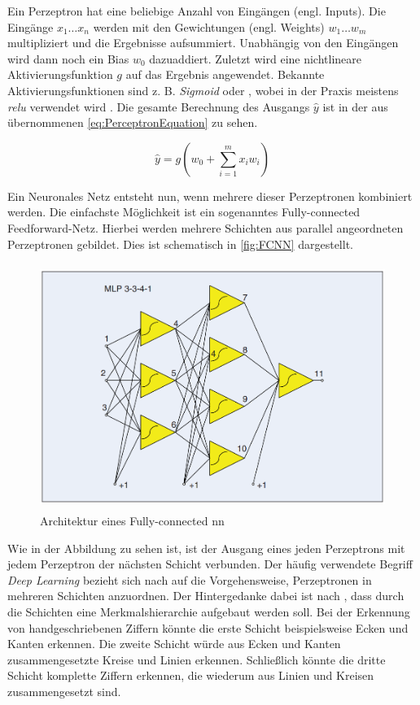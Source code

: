 Ein Perzeptron hat eine beliebige Anzahl von Eingängen (engl. Inputs).
Die Eingänge $x_1 \dots x_n$ werden mit den Gewichtungen (engl. Weights) $w_1 \dots w_m$ multipliziert und die Ergebnisse aufsummiert.
Unabhängig von den Eingängen wird dann noch ein Bias $w_0$ dazuaddiert.
Zuletzt wird eine nichtlineare Aktivierungsfunktion $g$ auf das Ergebnis angewendet.
Bekannte Aktivierungsfunktionen sind z. B. \emph{Sigmoid} oder \emph{}, wobei in der Praxis meistens \emph{\acrshort{relu}} verwendet wird \cite{ActivFuncSharma,ActivFuncNwankpa}.
Die gesamte Berechnung des Ausgangs $\hat{y}$ ist in der aus \cite{6S191Intro} übernommenen \autoref{eq:PerceptronEquation} zu sehen.

\begin{equation}
    \hat{y} = g\left(w_0 + \sum_{i=1}^{m} x_i w_i \right)  
\label{eq:PerceptronEquation}
\end{equation}

Ein Neuronales Netz entsteht nun, wenn mehrere dieser Perzeptronen kombiniert werden.
Die einfachste Möglichkeit ist ein sogenanntes Fully-connected Feedforward-Netz.
Hierbei werden mehrere Schichten aus parallel angeordneten Perzeptronen gebildet.
Dies ist schematisch in \autoref{fig:FCNN} dargestellt.

\begin{figure}[h]
    \centering
    \includegraphics[width=1\textwidth,height=8cm,keepaspectratio=true]{content/images/FCNN.png}
    \caption{Architektur eines Fully-connected \acrshort{nn} \cite[FIGURE 1]{NNArchitectures}}
    \label{fig:FCNN}
\end{figure}

Wie in der Abbildung zu sehen ist, ist der Ausgang eines jeden Perzeptrons mit jedem Perzeptron der nächsten Schicht verbunden.
Der häufig verwendete Begriff \emph{Deep Learning} bezieht sich nach \cite[S. 27]{DeepLearningPythonKeras} auf die Vorgehensweise, Perzeptronen in mehreren Schichten anzuordnen.
Der Hintergedanke dabei ist nach \cite{6S191Intro}, dass durch die Schichten eine Merkmalshierarchie aufgebaut werden soll.
Bei der Erkennung von handgeschriebenen Ziffern könnte die erste Schicht beispielsweise Ecken und Kanten erkennen.
Die zweite Schicht würde aus Ecken und Kanten zusammengesetzte Kreise und Linien erkennen.
Schließlich könnte die dritte Schicht komplette Ziffern erkennen, die wiederum aus Linien und Kreisen zusammengesetzt sind.


